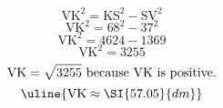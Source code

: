\[\text{VK}^{2}=\text{KS}^{2}-\text{SV}^{2}\]
\[\text{VK}^{2}=68^{2}-37^{2}\]
\[\text{VK}^{2}=4624-1369\]
\[\text{VK}^{2}=3255\]
\[\text{VK}=\sqrt{\mathstrut 3255}\text{ because VK is positive.}\]
\[\uline{\text{VK}\approx\SI{57.05}{dm}}\]
